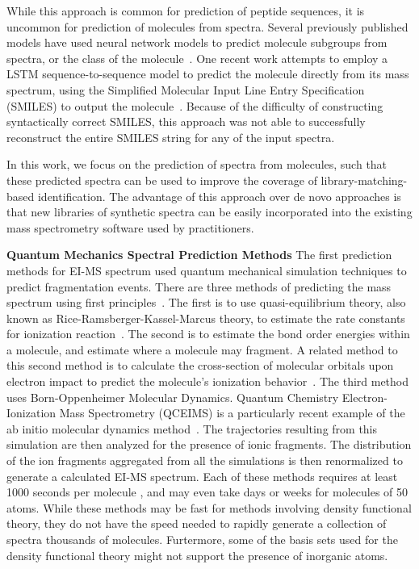 \documentclass{article}
\begin{document}
While this approach is common for prediction of peptide sequences, it is uncommon for prediction of molecules from spectra. Several previously published models have used neural network models to predict molecule subgroups from spectra, or the class of the molecule~\cite{curry1990msnet,spec2smiles}. One recent work attempts to employ a LSTM sequence-to-sequence model to predict the molecule directly from its mass spectrum, using the Simplified Molecular Input Line Entry Specification (SMILES) to output the molecule~\cite{spec2smiles}. Because of the difficulty of constructing syntactically correct SMILES, this approach was not able to successfully reconstruct the entire SMILES string for any of the input spectra.
    
In this work, we focus on the prediction of spectra from molecules, such that these predicted spectra can be used to improve the coverage of library-matching-based identification. The advantage of this approach over de novo approaches is that new libraries of synthetic spectra can be easily incorporated into the existing mass spectrometry software used by practitioners.
  
\textbf{Quantum Mechanics Spectral Prediction Methods} 
The first prediction methods for EI-MS spectrum used quantum mechanical simulation techniques to predict fragmentation events. There are three methods of predicting the mass spectrum using first principles~\cite{bauer2016compute}.
The first is to use quasi-equilibrium theory, also known as Rice-Ramsberger-Kassel-Marcus theory, to estimate the rate constants for ionization reaction~\cite{lorquet1994whither, lorquet2000landmarks, rosenstock1952absolute}.
The second is to estimate the bond order energies within a molecule, and estimate where a molecule may fragment. A related method to this second method is to calculate the cross-section of molecular orbitals upon electron impact to predict the molecule's ionization behavior~\cite{irikura2017ab, Guerra_BEB_model}.
The third method uses Born-Oppenheimer Molecular Dynamics. Quantum Chemistry Electron-Ionization Mass Spectrometry (QCEIMS) is a particularly recent example of the ab initio molecular dynamics method~\cite{grimme2013towards,Asgeirsson_QCEIMS,bauer2016compute}.
The trajectories resulting from this simulation are then analyzed for the presence of ionic fragments. The distribution of the ion fragments aggregated from all the simulations is then renormalized to generate a calculated EI-MS spectrum.
Each of these methods requires at least 1000 seconds per molecule \cite{allen2016computational}, and may even take days or weeks for molecules of 50 atoms. While these methods may be fast for methods involving density functional theory, they do not have the speed needed to rapidly generate a collection of spectra thousands of molecules. Furtermore, some of the basis sets used for the density functional theory might not support the presence of inorganic atoms.
    
\end{document}
